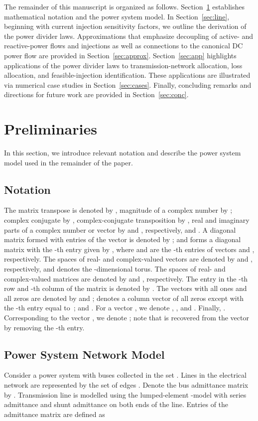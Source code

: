 \documentclass[journal]{IEEEtran}
\theoremstyle{definition}
\begin{document}
The remainder of this manuscript is organized as follows.  Section~\ref{sec:prelim} establishes mathematical notation and the power system model. In Section~\ref{sec:line}, beginning with current injection sensitivity factors, we outline the derivation of the power divider laws. Approximations that emphasize decoupling of active- and reactive-power flows and injections as well as connections to the canonical DC power flow are provided in Section~\ref{sec:approx}.  Section~\ref{sec:app} highlights applications of the power divider laws to transmission-network allocation, loss allocation, and feasible-injection identification.  These applications are illustrated via numerical case studies in Section~\ref{sec:cases}. Finally, concluding remarks and directions for future work are provided in Section~\ref{sec:conc}. 

\section{Preliminaries} \label{sec:prelim}
In this section, we  introduce relevant notation and describe the power system model used in the remainder of the paper.  
\subsection{Notation} \label{sec:Notation}
The matrix transpose is denoted by , magnitude of a complex number by ; complex conjugate by , complex-conjugate transposition by , real and imaginary parts of a complex number or vector by  and , respectively, and . A diagonal matrix formed with entries of the vector  is denoted by ; and  forms a diagonal matrix with the -th entry given by , where  and  are the -th entries of vectors  and , respectively. The spaces of  real- and complex-valued vectors are denoted by  and , respectively, and  denotes the -dimensional torus.  The spaces of  real- and complex-valued matrices are denoted by  and , respectively.  The entry in the -th row and -th column of the matrix  is denoted by . The  vectors with all ones and all zeros are denoted by  and ;  denotes a column vector of all zeros except with the -th entry equal to~; and . For a vector , we denote , , and . Finally, . Corresponding to the vector , we denote ; note that  is recovered from the vector  by removing the -th entry.

\subsection{Power System Network Model}
Consider a power system with  buses collected in the set .  Lines in the electrical network are represented by the set of edges . Denote the bus admittance matrix by . Transmission line  is modelled using the lumped-element -model with series admittance  and shunt admittance  on both ends of the line. Entries of the admittance matrix are defined as
\end{document}
